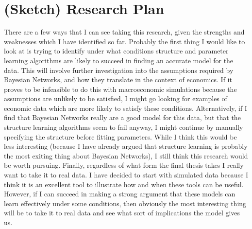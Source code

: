 \documentclass{article}
\begin{document}
\section{(Sketch) Research Plan}
There are a few ways that I can see taking this research, given the strengths and weaknesses which I have identified so far. Probably the first thing I would like to look at is trying to identify under what conditions structure and parameter learning algorithms are likely to succeed in finding an accurate model for the data. This will involve further investigation into the assumptions required by Bayesian Networks, and how they translate in the context of economics. If it proves to be infeasible to do this with macroeconomic simulations because the assumptions are unlikely to be satisfied, I might go looking for examples of economic data which are more likely to satisfy these conditions. Alternatively, if I find that Bayesian Networks really are a good model for this data, but that the structure learning algorithms seem to fail anyway, I might continue by manually specifying the structure before fitting parameters. While I think this would be less interesting (because I have already argued that structure learning is probably the most exiting thing about Bayesian Networks), I still think this research would be worth pursuing. Finally, regardless of what form the final thesis takes I really want to take it to real data. I have decided to start with simulated data because I think it is an excellent tool to illustrate how and when these tools can be useful. However, if I can succeed in making a strong argument that these models can learn effectively under some conditions, then obviously the most interesting thing will be to take it to real data and see what sort of implications the model gives us.  

\printbibliography
\end{document}
